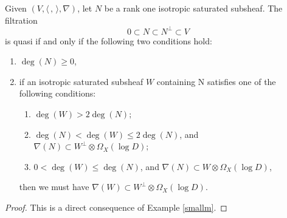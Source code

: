\begin{lem}\label{criterion}
Given $(V,\langle \,, \, \rangle,\nabla)$, let $N$ be a rank one isotropic saturated subsheaf. The filtration
\[
0\subset N\subset N^\perp\subset V
\]
is quasi \grsemistable if and only if the following two conditions hold:
\begin{enumerate}
\item $\deg(N)\geq 0$,

\item if an isotropic saturated subsheaf $W$ containing N satisfies one of the following conditions:
\begin{enumerate}
\item $\deg(W)>2\deg(N);$

\item $\deg(N)<\deg(W)\leq2\deg(N)$, and $\nabla(N)\subset W^\perp\otimes \Omega_X(\log D);$

\item $0<\deg(W)\leq \deg(N)$, and $\nabla(N)\subset W\otimes \Omega_X(\log D)$,
\end{enumerate}
then we must have $\nabla(W)\subset W^\perp\otimes \Omega_X(\log D)$.
\end{enumerate}
\end{lem}

\begin{proof} 
This is a direct consequence of Example \ref{smallm}.
\end{proof}

